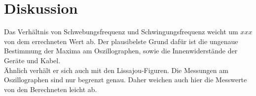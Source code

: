 \section{Diskussion}
\label{sec:Diskussion}

Das Verhältnis von Schwebungsfrequenz und Schwingungsfrequenz weicht um \(xxx\) von dem errechneten Wert ab.
Der plausibelste Grund dafür ist die ungenaue Bestimmung der Maxima am Oszillographen, sowie die Innenwiderstände der Geräte und Kabel.
\\
Ähnlich verhält er sich auch mit den Lissajou-Figuren. Die Messungen am Oszillographen sind nur begrenzt genau.
Daher weichen auch hier die Messwerte von den Berechneten leicht ab.

